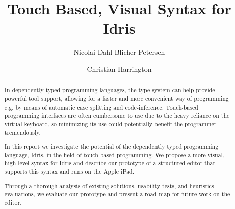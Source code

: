 \documentclass[oribibl]{llncs}
\begin{document}
\mainmatter{}
\title{Touch Based, Visual Syntax for Idris}
\author{Nicolai Dahl Blicher-Petersen \and Christian Harrington \\
}

\maketitle

\begin{abstract}
In dependently typed programming languages, the type system can help provide powerful tool support, allowing for a faster and more
convenient way of programming e.g. by means of automatic case splitting and code-inference. Touch-based programming interfaces are often
cumbersome to use due to the heavy reliance on the virtual keyboard, so
minimizing its use could potentially benefit the programmer tremendously.

In this report we investigate the potential of the dependently typed
programming language, Idris, in the field of touch-based programming.
We propose a more visual, high-level syntax for Idris and describe our prototype of a structured editor
that supports this syntax and runs on the Apple iPad.

Through a thorough analysis of existing solutions, usability tests, and
heuristics evaluations, we evaluate our prototype and present a road map for
future work on the editor.


\end{abstract}












\newpage

\end{document}
